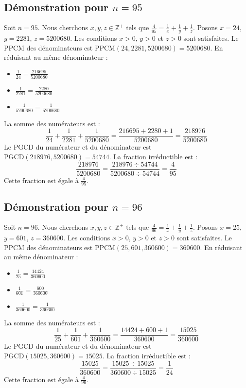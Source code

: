 \documentclass[11pt,a4paper]{article}
\begin{document}
\subsection{Démonstration pour $n = 95$}
Soit $n = 95$. Nous cherchons $x, y, z \in \mathbb{Z}^{+}$ tels que $\frac{4}{95} = \frac{1}{x} + \frac{1}{y} + \frac{1}{z}$.
Posons $x = 24$, $y = 2281$, $z = 5200680$.
Les conditions $x > 0$, $y > 0$ et $z > 0$ sont satisfaites.
Le PPCM des dénominateurs est $\text{PPCM}(24, 2281, 5200680) = 5200680$.
En réduisant au même dénominateur :
\begin{itemize}
    \item $\frac{1}{24} = \frac{216695}{5200680}$
    \item $\frac{1}{2281} = \frac{2280}{5200680}$
    \item $\frac{1}{5200680} = \frac{1}{5200680}$
\end{itemize}
La somme des numérateurs est :
$$ \frac{1}{24} + \frac{1}{2281} + \frac{1}{5200680} = \frac{216695 + 2280 + 1}{5200680} = \frac{218976}{5200680} $$
Le PGCD du numérateur et du dénominateur est $\text{PGCD}(218976, 5200680) = 54744$.
La fraction irréductible est :
$$ \frac{218976}{5200680} = \frac{218976 \div 54744}{5200680 \div 54744} = \frac{4}{95} $$
Cette fraction est égale à $\frac{4}{95}$.

\subsection{Démonstration pour $n = 96$}
Soit $n = 96$. Nous cherchons $x, y, z \in \mathbb{Z}^{+}$ tels que $\frac{4}{96} = \frac{1}{x} + \frac{1}{y} + \frac{1}{z}$.
Posons $x = 25$, $y = 601$, $z = 360600$.
Les conditions $x > 0$, $y > 0$ et $z > 0$ sont satisfaites.
Le PPCM des dénominateurs est $\text{PPCM}(25, 601, 360600) = 360600$.
En réduisant au même dénominateur :
\begin{itemize}
    \item $\frac{1}{25} = \frac{14424}{360600}$
    \item $\frac{1}{601} = \frac{600}{360600}$
    \item $\frac{1}{360600} = \frac{1}{360600}$
\end{itemize}
La somme des numérateurs est :
$$ \frac{1}{25} + \frac{1}{601} + \frac{1}{360600} = \frac{14424 + 600 + 1}{360600} = \frac{15025}{360600} $$
Le PGCD du numérateur et du dénominateur est $\text{PGCD}(15025, 360600) = 15025$.
La fraction irréductible est :
$$ \frac{15025}{360600} = \frac{15025 \div 15025}{360600 \div 15025} = \frac{1}{24} $$
Cette fraction est égale à $\frac{4}{96}$.
\end{document}
